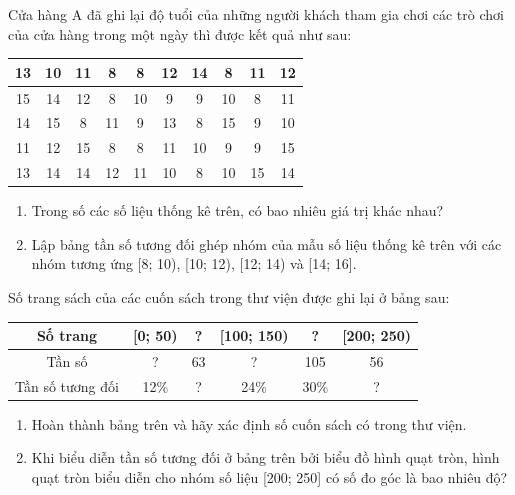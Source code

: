 \documentclass[%
    fontsize=12pt,%
    chapterprefix=false,%
    open=right,%
    twoside=false,%
    numbers=noenddot,%
    headings=optiontohead,%
    final,%
    DIV=15,%
    parskip=half %
]{scrbook}
\begin{document}
\begin{tuluan}
\item Cửa hàng A đã ghi lại độ tuổi của những người khách tham gia chơi các trò chơi của cửa hàng trong một ngày thì được kết quả như sau: \begin{tabular}{|c|c|c|c|c|c|c|c|c|c|} \hline 13 & 10 & 11 & 8 & 8 & 12 & 14 & 8 & 11 & 12 \\ \hline 15 & 14 & 12 & 8 & 10 & 9 & 9 & 10 & 8 & 11 \\ \hline 14 & 15 & 8 & 11 & 9 & 13 & 8 & 15 & 9 & 10 \\ \hline 11 & 12 & 15 & 8 & 8 & 11 & 10 & 9 & 9 & 15 \\ \hline 13 & 14 & 14 & 12 & 11 & 10 & 8 & 10 & 15 & 14 \\ \hline \end{tabular}
\begin{enumerate}[label=\alph*)]
  \item[a)] Trong số các số liệu thống kê trên, có bao nhiêu giá trị khác nhau?
  \item[b)] Lập bảng tần số tương đối ghép nhóm của mẫu số liệu thống kê trên với các nhóm tương ứng [8; 10), [10; 12), [12; 14) và [14; 16].
\end{enumerate}

\item Số trang sách của các cuốn sách trong thư viện được ghi lại ở bảng sau: \begin{tabular}{|c|c|c|c|c|c|} \hline Số trang & [0; 50) & ? & [100; 150) & ? & [200; 250) \\ \hline Tần số & ? & 63 & ? & 105 & 56 \\ \hline Tần số tương đối & 12\% & ? & 24\% & 30\% & ? \\ \hline \end{tabular}
\begin{enumerate}[label=\alph*)]
  \item[a)] Hoàn thành bảng trên và hãy xác định số cuốn sách có trong thư viện.
  \item[b)] Khi biểu diễn tần số tương đối ở bảng trên bởi biểu đồ hình quạt tròn, hình quạt tròn biểu diễn cho nhóm số liệu [200; 250] có số đo góc là bao nhiêu độ?
\end{enumerate}


\end{tuluan}
\end{document}

